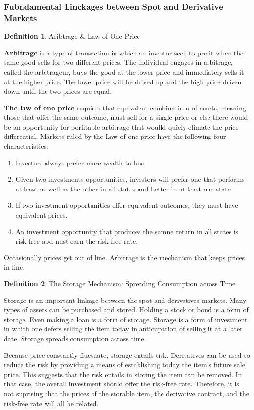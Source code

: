 \documentclass{book}
\theoremstyle{definition}
\newtheorem{definition}{Definition}[section]
\theoremstyle{remark}
\begin{document}
\subsubsection{Fubndamental Linckages between Spot and Derivative Markets}
    \begin{definition}{Aribtrage \& Law of One Price}
        
        \textbf{Arbitrage} is a type of transaction in which an investor seek to profit when the same good sells for two different prices. The individual engages in arbitrage, called the arbitrageur, buys the good at the lower price and immediately sells it at the higher price. The lower price will be drived up and the high price driven down until the two prices are equal. 
        
        \textbf{The law of one price} requires that equivalent combinatiron of assets, meaning those that offer the same outcome, must sell for a single price or else there would be an opportunity for porfitable arbitrage that woulld quicly elimate the price differential. Markets ruled by the Law of one price have the following four characteristics: 
            \begin{enumerate}
                \item Investors always prefer more wealth to less
                \item Given two investments opportunities, investors will prefer one that performs at least as well as the other in all states and better in at least one state
                \item If two investment opportunities offer equivalent outcomes, they must have equivalent prices. 
                \item An investment opportunity that produces the samne return in all states is risk-free abd nust earn the risk-free rate. 
            \end{enumerate}
        Occasionally prices get out of line. Arbitrage is the mechanism that keeps prices in line.
    \end{definition}
    
    \begin{definition}{The Storage Mechanism: Spreading Consumption across Time}
    
        Storage is an important linkage between the spot and derivatives markets. Many types of assets can be purchased and stored. Holding a stock or bond is a form of storage. Even making a loan is a form of storage. Storage is a form of investment in which one defers selling the item today in anticupation of selling it at a later date. Storage spreads consumption across time. 
        
        Because price constantly fluctuate, storage entails tisk. Derivatives can be used to reduce the risk by providing a means of establishing today the item's future sale price. This suggests that the risk entails in storing the item can be removed. In that case, the overall investment should offer the risk-free rate. Therefore, it is not suprising that the prices of the storable item, the derivative contract, and the risk-free rate will all be related. 
    \end{definition}
\end{document}
